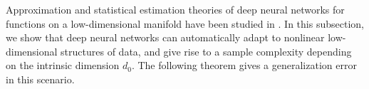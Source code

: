\documentclass[11pt]{article} %
\begin{document}

Approximation and statistical estimation theories of deep neural networks for functions on a low-dimensional manifold have been studied in \citep{chen2019efficient,chen2019nonparametric,chen2020doubly,hao2021icml,shijun2,Jiao2021DeepNR,cloninger2020relu,shaham2018provable,schmidt2019deep,du2021discovery,nakada2020adaptive}. %
In this subsection, we show that deep neural networks can automatically adapt to nonlinear low-dimensional structures of data, and give rise to a sample complexity depending on the intrinsic dimension  $d_0$. %
The following theorem gives a generalization error in this scenario.





\end{document}
